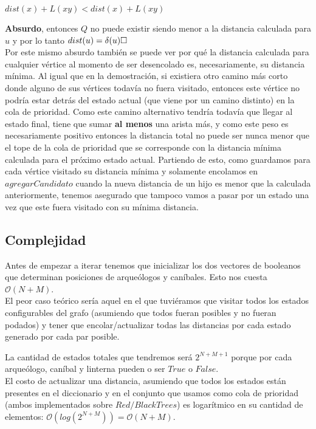 \begin{center}
$dist(x)+L(xy) < dist(x) + L(xy)$
\\
\end{center}
\textbf{Absurdo}, entonces $Q$ no puede existir siendo menor a la distancia calculada para $u$ y por lo tanto $dist(u) = \delta(u) \QEDB$
\\

Por este mismo absurdo también se puede ver por qué la distancia calculada para cualquier vértice al momento de ser desencolado es, necesariamente, su distancia mínima. Al igual que en la demostración, si existiera otro camino más corto donde alguno de sus vértices todavía no fuera visitado, entonces este vértice no podría estar detrás del estado actual (que viene por un camino distinto) en la cola de prioridad. Como este camino alternativo tendría todavía que llegar al estado final, tiene que sumar \textbf{al menos} una arista más, y como este peso es necesariamente positivo entonces la distancia total no puede ser nunca menor que el tope de la cola de prioridad que se corresponde con la distancia mínima calculada para el próximo estado actual. Partiendo de esto, como guardamos para cada vértice visitado su distancia mínima y solamente encolamos en $agregarCandidato$ cuando la nueva distancia de un hijo es menor que la calculada anteriormente, tenemos asegurado que tampoco vamos a pasar por un estado una vez que este fuera visitado con su mínima distancia.

\subsection{Complejidad}
Antes de empezar a iterar tenemos que inicializar los dos vectores de booleanos que determinan posiciones de arqueólogos y caníbales. Esto nos cuesta $\mathcal{O}(N+M)$. \\

El peor caso teórico sería aquel en el que tuviéramos que visitar todos los estados configurables del grafo (asumiendo que todos fueran posibles y no fueran podados) y tener que encolar/actualizar todas las distancias por cada estado generado por cada par posible.

La cantidad de estados totales que tendremos será $2^{N+M+1}$ porque por cada arqueólogo, caníbal y linterna pueden o ser $True$ o $False$. \\

El costo de actualizar una distancia, asumiendo que todos los estados están presentes en el diccionario y en el conjunto que usamos como cola de prioridad (ambos implementados sobre $Red/Black Trees$) es logarítmico en su cantidad de elementos: $\mathcal{O}(log(2^{N+M})) = \mathcal{O}(N+M)$. \\

